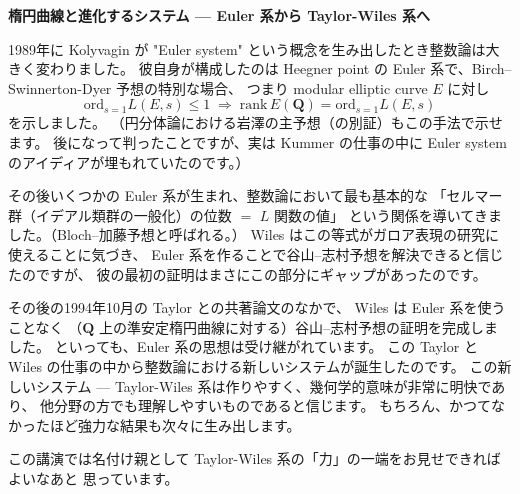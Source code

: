 \documentclass[uplatex,dvipdfmx]{jlreq}
\begin{document}
\newpage

\noindent
{\large\bfseries 楕円曲線と進化するシステム --- Euler 系から Taylor-Wiles 系へ}

\bigskip
\hspace*{\fill}{\large\bfseries 藤原　一宏（名大・多元数理）}

\bigskip

1989年に Kolyvagin が "Euler system" という概念を生み出したとき整数論は大きく変わりました。
彼自身が構成したのは Heegner point の Euler 系で、Birch--Swinnerton-Dyer 予想の特別な場合、
つまり modular elliptic curve $E$ に対し
\[
  \mathrm{ord}_{s=1} L(E, s) \le 1
  \;\Rightarrow\;
  \mathrm{rank}\, E(\mathbf{Q}) = \mathrm{ord}_{s=1} L(E, s)
\]
を示しました。
（円分体論における岩澤の主予想（の別証）もこの手法で示せます。
後になって判ったことですが、実は Kummer の仕事の中に
Euler system のアイディアが埋もれていたのです。）

その後いくつかの Euler 系が生まれ、整数論において最も基本的な
「セルマー群（イデアル類群の一般化）の位数 $=$ $L$ 関数の値」
という関係を導いてきました。（Bloch--加藤予想と呼ばれる。）
Wiles はこの等式がガロア表現の研究に使えることに気づき、
Euler 系を作ることで谷山--志村予想を解決できると信じたのですが、
彼の最初の証明はまさにこの部分にギャップがあったのです。

その後の1994年10月の Taylor との共著論文のなかで、
Wiles は Euler 系を使うことなく
（$\mathbf{Q}$ 上の準安定楕円曲線に対する）谷山--志村予想の証明を完成しました。
といっても、Euler 系の思想は受け継がれています。
この Taylor と Wiles の仕事の中から整数論における新しいシステムが誕生したのです。
この新しいシステム --- Taylor-Wiles 系は作りやすく、幾何学的意味が非常に明快であり、
他分野の方でも理解しやすいものであると信じます。
もちろん、かつてなかったほど強力な結果も次々に生み出します。

この講演では名付け親として Taylor-Wiles 系の「力」の一端をお見せできればよいなあと
思っています。
\end{document}
